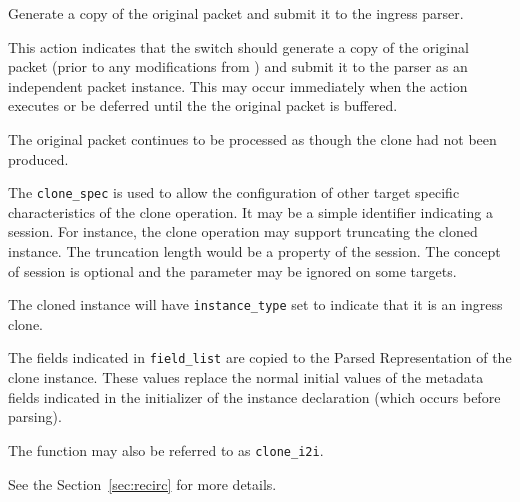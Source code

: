 \documentclass[12pt]{article}
\begin{document}
{ %
Generate a copy of the original packet and submit it to the ingress parser.
}
{ %
}
{ %
This action indicates that the switch should generate a copy of the original 
packet (prior to any modifications from \matchaction) and submit it to the 
parser as an independent packet instance.  This may occur immediately when 
the action executes or be deferred until the the original packet is buffered. 
 

The original packet continues to be processed as though the clone had not 
been produced.

The \texttt{clone_spec} is used to allow the configuration of other target specific 
characteristics of the clone operation. It may be a simple identifier indicating 
a session. For instance, the clone operation may support truncating the cloned 
instance. The truncation length would be a property of the session. The concept 
of session is optional and the parameter may be ignored on some targets.

The cloned instance will have \texttt{instance_type} set to indicate that it is an 
ingress clone. 

The fields indicated in \texttt{field_list} are copied to the Parsed Representation 
of the clone instance. These values replace the normal initial values of the 
metadata fields indicated in the initializer of the instance declaration (which 
occurs before parsing).

The function may also be referred to as \texttt{clone_i2i}.

See the Section~\ref{sec:recirc} for more details.
}

\end{document}
